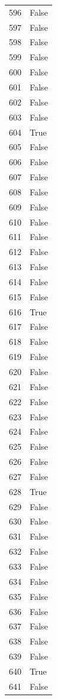 \documentclass[
  letterpaper,
  DIV=11,
  numbers=noendperiod]{scrreprt}
\begin{document}
\begin{tabular}{ll}
596  &  False \\
597  &  False \\
598  &  False \\
599  &  False \\
600  &  False \\
601  &  False \\
602  &  False \\
603  &  False \\
604  &   True \\
605  &  False \\
606  &  False \\
607  &  False \\
608  &  False \\
609  &  False \\
610  &  False \\
611  &  False \\
612  &  False \\
613  &  False \\
614  &  False \\
615  &  False \\
616  &   True \\
617  &  False \\
618  &  False \\
619  &  False \\
620  &  False \\
621  &  False \\
622  &  False \\
623  &  False \\
624  &  False \\
625  &  False \\
626  &  False \\
627  &  False \\
628  &   True \\
629  &  False \\
630  &  False \\
631  &  False \\
632  &  False \\
633  &  False \\
634  &  False \\
635  &  False \\
636  &  False \\
637  &  False \\
638  &  False \\
639  &  False \\
640  &   True \\
641  &  False \\

\end{tabular}
\end{document}
